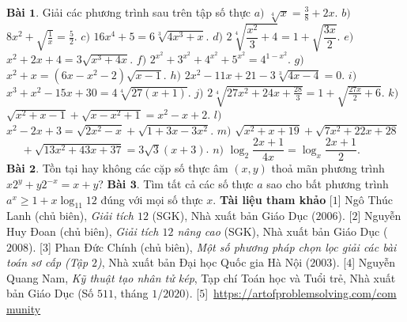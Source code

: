 \begin{multicols}{2}
	\vskip 0.1cm
	\textbf{\color{diendantoanhoc}Bài $\pmb{1.}$} Giải các phương trình sau trên tập số thực
	\vskip 0.1cm
	$a)$  $\sqrt[4]{x}=\frac{3}{8}+2x$.
	\vskip 0.1cm
	$b)$ $8x^2+\sqrt{\frac{1}{x}}=\frac{5}{2}.$
	\vskip 0.1cm
	$c)$ $16x^4+5=6\sqrt[3]{4x^3+x}.$
	\vskip 0.1cm
	$d)$ $ 2\sqrt[4]{\dfrac{x^{2}}{3}+4}=1+\sqrt{\dfrac{3x}{2}}.$
	\vskip 0.1cm
	$e)$ $x^2+2x+4=3\sqrt{x^3+4x}.$
	\vskip 0.1cm
	$f)$ $2^{x^2}+3^{x^2}+4^{x^2}+5^{x^2}=4^{1-x^2}.$
	\vskip 0.1cm
	$g)$ $x^2+x = (6x-x^2-2)\sqrt{x-1}.$
	\vskip 0.1cm
	$h)$ $2x^2-11x+21-3\sqrt[3]{4x-4}=0.$
	\vskip 0.1cm
	$i)$ $x^{3}+x^{2}-15x+30=4\sqrt[4]{27(x+1)}.$
	\vskip 0.1cm
	$j)$ $2\sqrt[4]{27x^2+24x+\frac{28}{3}}=1+\sqrt{\frac{27x}{2}+6}.$
	\vskip 0.1cm
	$k)$ $\sqrt{x^2+x-1}+\sqrt{x-x^2+1}=x^2-x+2.$
	\vskip 0.1cm
	$l)$ $x^2-2x+3=\sqrt{2x^2-x}+\sqrt{1+3x-3x^2}.$
	\vskip 0.1cm
	$m)$ $\sqrt{x^2+x+19}+\sqrt{7x^2+22x+28}$\\
	$\quad\,\,+\sqrt{13x^2+43x+37}=3\sqrt{3}(x+3)$.
	\vskip 0.1cm
	$n)$ $\log_2 \dfrac{2x+1}{4x} = \log_{x} \dfrac{2x+1}{2}.$\\
	\vskip 0.1cm
	\textbf{\color{diendantoanhoc}Bài $\pmb{2.}$} Tồn tại hay không các cặp số thực âm $(x,y)$ thoả mãn phương trình \linebreak$x2^y+y2^{-x}=x+y$?
	\vskip 0.1cm
	\textbf{\color{diendantoanhoc}Bài $\pmb{3.}$} Tìm tất cả các số thực $a$ sao cho bất phương trình $a^x\geq 1+x\log _{11}12$ đúng với mọi số thực $x$.
	\vskip 0.1cm
	\textbf{\color{diendantoanhoc}Tài liệu tham khảo}
	\vskip 0.1cm
	[$1$] Ngô Thúc Lanh (chủ biên), {\it Giải tích $12$ }(SGK), Nhà xuất bản Giáo Dục ($2006$).
	\vskip 0.1cm
	[$2$] Nguyễn Huy Đoan (chủ biên), {\it Giải tích $12$ nâng cao} (SGK), Nhà xuất bản Giáo Dục ($2008$).
	\vskip 0.1cm
	[$3$] Phan Đức Chính (chủ biên), {\it Một số phương pháp chọn lọc giải các bài toán sơ cấp (Tập $2$)}, Nhà xuất bản Đại học Quốc gia Hà Nội ($2003$). 
	\vskip 0.1cm
	[$4$] Nguyễn Quang Nam, {\it Kỹ thuật tạo nhân tử kép}, Tạp chí Toán học và Tuổi trẻ, Nhà xuất bản Giáo Dục (Số $511$, tháng $1/2020)$.
	\vskip 0.1cm
	[$5$]~\url{https://artofproblemsolving.com/com} \url{munity}
	\end{multicols}